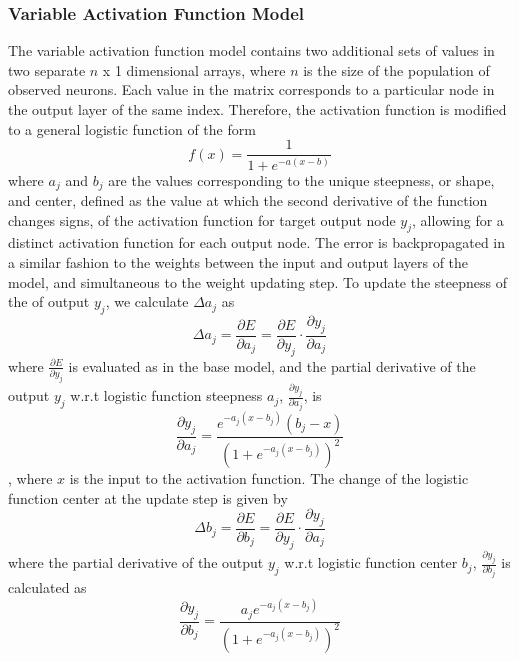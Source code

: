 \documentclass[11pt,titlepage]{article}
\begin{document}
\subsubsection{Variable Activation Function Model}\label{sssec:VAF}
The variable activation function model contains two additional sets of values in two separate $n$ x 1 dimensional arrays, where $n$ is the size of the population of observed neurons. Each value in the matrix corresponds to a particular node in the output layer of the same index. Therefore, the activation function is modified to a general logistic function of the form $$ f(x) = \frac{1}{1+e^{-a(x - b)}}$$ where $a_j$ and $b_j$ are the values corresponding to the unique steepness, or shape, and center, defined as the value at which the second derivative of the function changes signs, of the activation function for target output node $y_j$, allowing for a distinct activation function for each output node. The error is backpropagated in a similar fashion to the weights between the input and output layers of the model, and simultaneous to the weight updating step. To update the steepness of the of output $y_j$, we calculate $\Delta a_j$ as
 $$\Delta a_j = \frac{\partial E}{\partial a_j} = \frac{\partial E}{\partial y_j} \cdot \frac{\partial y_j}{\partial a_j}$$
 where $\frac{\partial E}{\partial y_j}$ is evaluated as in the base model, and the partial derivative of the output $y_j$ w.r.t logistic function steepness $a_j$, $\frac{\partial y_j}{\partial a_j}$, is 
 $$\frac{\partial y_j}{\partial a_j}=\frac{e^{-a_j(x-b_j)}(b_j - x)}{(1+e^{-a_j(x-b_j)})^2}$$, where $x$ is the input to the activation function. The change of the logistic function center at the update step is given by 
 $$\Delta b_j = \frac{\partial E}{\partial b_j} = \frac{\partial E}{\partial y_j} \cdot \frac{\partial y_j}{\partial a_j}$$ 
 where the partial derivative of the output $y_j$ w.r.t logistic function center $b_j$, $\frac{\partial y_j}{\partial b_j}$ is calculated as 
 $$\frac{\partial y_j}{\partial b_j} = \frac{a_je^{-a_j(x - b_j)}}{(1 + e^{-a_j(x - b_j)})^2} $$
\end{document}
